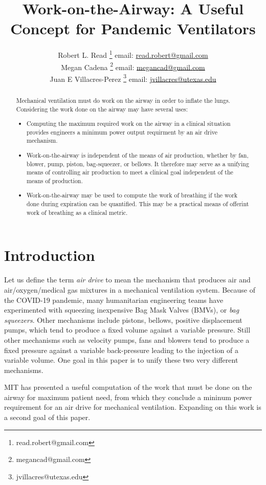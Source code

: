 \documentclass{article}
\title{Work-on-the-Airway: A Useful Concept for Pandemic Ventilators}
\author{Robert L. Read
  \thanks{read.robert@gmail.com}
  email: \href{mailto:read.robert@gmail.com}{read.robert@gmail.com}\\
Megan Cadena
  \thanks{megancad@gmail.com}
  email: \href{mailto:megancad@gmail.com}{megancad@gmail.com}\\
  Juan E Villacres-Perez
  \thanks{jvillacres@utexas.edu}
  email: \href{mailto:jvillacres@utexas.edu}{jvillacres@utexas.edu}
  }
\begin{document}
\maketitle
\begin{abstract}
  Mechanical ventilation must do work on the airway in order to inflate the lungs.
  Considering the work done on the airway may have several uses:
  \begin{itemize}
  \item Computing the maximum required work on the airway in
    a clinical situation provides engineers a minimum power output requirment
    by an air drive mechanism.
  \item Work-on-the-airway is independent of the means of air production,
    whether by fan, blower, pump, piston, bag-squeezer, or bellows. It therefore
    may serve as a unifying means of controlling air production to meet
    a clinical goal independent of the means of production.
  \item Work-on-the-airway may be used to compute the work of breathing
    if the work done during expiration can be quantified. This may be
    a practical means of offerint work of breathing as a clinical metric.
    \end{itemize}

\end{abstract}


\section{Introduction}

Let us define the term {\em air drive} to mean the mechanism that
produces air and air/oxygen/medical gas mixtures in a mechanical
ventilation system. Because of the
COVID-19 pandemic, many humanitarian engineering teams have
experimented with squeezing inexpensive Bag Mask Valves (BMVs), or
{\em bag squeezers}.
Other mechanisms include pistons, bellows,
positive displacement pumps, which tend to produce a fixed volume against
a variable pressure.
Still other mechanisms such as velocity pumps,
fans and blowers tend to produce a fixed
pressure against a variable back-pressure leading to the injection
of a variable volume. One goal in this paper is to unify these
two very different mechanisms.

MIT has presented a useful computation of the work that must be done
on the airway for maximum patient need, from which they conclude a
mininum power requirement for an air drive for
mechanical ventilation\cite{mitpowercalculation}. Expanding on
this work is a second goal of this paper.
\end{document}
